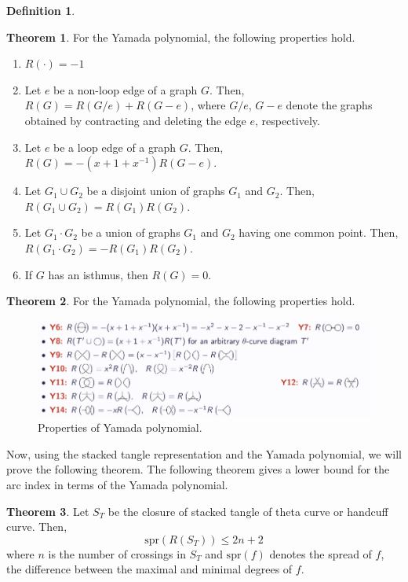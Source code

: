 \documentclass{article}
\theoremstyle{definition}
\newtheorem{defn}[thm]{Definition}
\theoremstyle{theorem}
\newtheorem{theorem}{Theorem}
\theoremstyle{proposition}
\theoremstyle{corollary}
\begin{document}
\begin{defn}
\begin{theorem}
    For the Yamada polynomial, the following properties hold.
    \begin{enumerate}
        \item $R( \cdot ) = -1$
        \item Let $e$ be a non-loop edge of a graph $G$. Then, $R(G) = R(G / e) + R(G - e)$, where $G/e$, $G-e$ denote the graphs obtained by contracting and deleting the edge $e$, respectively.
        \item Let $e$ be a loop edge of a graph $G$. Then, $R(G) = -(x+1+x^{-1}) R(G-e)$.
        \item Let $G_1 \cup G_2$ be a disjoint union of graphs $G_1$ and $G_2$. Then, $R(G_1 \cup G_2) = R(G_1)R(G_2)$.
        \item Let $G_1 \cdot G_2$ be a union of graphs $G_1$ and $G_2$ having one common point. Then, $R(G_1 \cdot G_2) = -R(G_1)R(G_2)$.
        \item If $G$ has an isthmus, then $R(G)=0$.
    \end{enumerate}
\end{theorem}

\begin{theorem}
    For the Yamada polynomial, the following properties hold.
    \begin{figure}[h]
        \centerline{\includegraphics[width=0.75\linewidth]{yamada_property.png}}
        \caption{Properties of Yamada polynomial.}
        \label{figure_3}
    \end{figure}
\end{theorem}

Now, using the stacked tangle representation and the Yamada polynomial, we will prove the following theorem. The following theorem gives a lower bound for the arc index in terms of the Yamada polynomial.

\begin{theorem}
    Let $S_T$ be the closure of stacked tangle of theta curve or handcuff curve. Then,
    \[ \text{spr}(R(S_T)) \leq 2n+2 \]
    where $n$ is the number of crossings in $S_T$ and $\mathrm{spr}(f)$ denotes the spread of $f$, the difference between the maximal and minimal degrees of $f$.
\end{theorem}


\end{defn}
\end{document}
